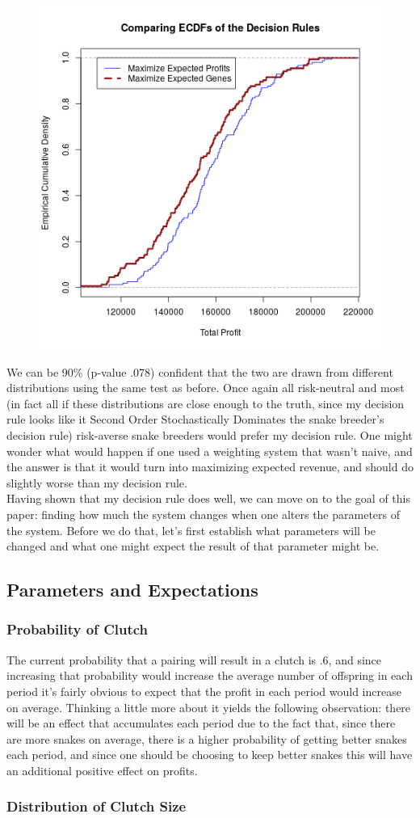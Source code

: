 \documentclass{article}
\begin{document}
	\begin{figure}[H]
	\centering
	\includegraphics[width=.75\textwidth]{newECDF.png}
	\end{figure}
	
	We can be 90\% (p-value .078) confident that the two are drawn from different distributions using the same test as before. Once again all risk-neutral and most (in fact all if these distributions are close enough to the truth, since my decision rule looks like it Second Order Stochastically Dominates the snake breeder's decision rule) risk-averse snake breeders  would prefer my decision rule. One might wonder what would happen if one used a weighting system that wasn't naive, and the answer is that it would turn into maximizing expected revenue, and should do slightly worse than my decision rule.\\
	\indent Having shown that my decision rule does well, we can move on to the goal of this paper: finding how much the system changes when one alters the parameters of the system. Before we do that, let's first establish what parameters will be changed and what one might expect the result of that parameter might be.
	\subsection*{Parameters and Expectations}
		\subsubsection*{Probability of Clutch}
		\indent The current probability that a pairing will result in a clutch is .6, and since increasing that probability would increase the average number of offspring in each period it's fairly obvious to expect that the profit in each period would increase on average. Thinking a little more about it yields the following observation: there will be an effect that accumulates each period due to the fact that, since there are more snakes on average, there is a higher probability of getting better snakes each period, and since one should be choosing to keep better snakes this will have an additional positive effect on profits.
		\subsubsection*{Distribution of Clutch Size}



\nocite{*}
\end{document}
